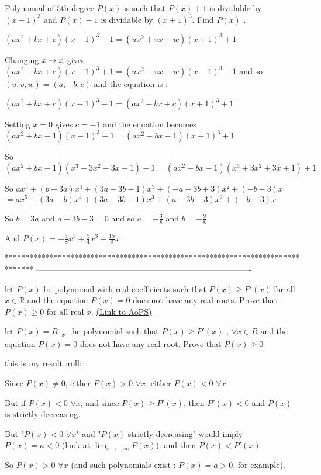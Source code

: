 \begin{solution}
	\begin{tcolorbox}Polynomial of $ 5$th degree $ P(x)$ is such that $ P(x) + 1$ is dividable by $ (x - 1)^3$ and $ P(x) - 1$ is dividable by $ (x + 1)^3$.
Find $ P(x)$ .\end{tcolorbox}

$ (ax^2+bx+c)(x-1)^3-1=(ux^2+vx+w)(x+1)^3+1$

Changing $ x\to\-x$ gives $ (ax^2-bx+c)(x+1)^3+1=(ux^2-vx+w)(x-1)^3-1$ and so $ (u,v,w)=(a,-b,c)$ and the equation is :

$ (ax^2+bx+c)(x-1)^3-1=(ax^2-bx+c)(x+1)^3+1$

Setting $ x=0$ gives $ c=-1$ and the equation becomes $ (ax^2+bx-1)(x-1)^3-1=(ax^2-bx-1)(x+1)^3+1$

So $ (ax^2+bx-1)(x^3-3x^2+3x-1)-1=(ax^2-bx-1)(x^3+3x^2+3x+1)+1$

So $ ax^5+(b-3a)x^4+(3a-3b-1)x^3+(-a+3b+3)x^2+(-b-3)x$ $ =ax^5+(3a-b)x^4+(3a-3b-1)x^3+(a-3b-3)x^2+(-b-3)x$

So $ b=3a$ and $ a-3b-3=0$ and so $ a=-\frac 38$ and $ b=-\frac 98$

And $ P(x)=-\frac 38x^5+\frac 54x^3-\frac {15}8x$
\end{solution}
*******************************************************************************
-------------------------------------------------------------------------------

\begin{problem}
	let $ P(x)$ be polynomial with real coefficients such that $ P(x) \ge P'(x)$ for all$ x \in \mathbb R$ and the equation $ P(x)=0$ does not have any real roots. Prove that $ P(x) \ge 0$ for all real $x$.
	\flushright \href{https://artofproblemsolving.com/community/c6h303472}{(Link to AoPS)}
\end{problem}



\begin{solution}
	\begin{tcolorbox}let $ P(x) = R_{[x]}$ be polynomial such that $ P(x) \ge P'(x)$ , $ \forall x \in R$ and the equation $ P(x) = 0$ does not have any real root.
Prove that $ P(x) \ge 0$

this is my result  :roll:\end{tcolorbox}

Since $ P(x)\neq 0$, either $ P(x)>0$ $ \forall x$, either $ P(x)<0$ $ \forall x$

But if $ P(x)<0$ $ \forall x$, and since $ P(x) \geq P'(x)$, then $ P'(x)<0$ and $ P(x)$ is strictly decreasing.

But "$ P(x)<0$ $ \forall x$" and "$ P(x)$ strictly decreasing" would imply $ P(x)=a <0$ (look at $ \lim_{x\to -\infty}P(x)$). and then $ P(x)<P'(x)$

So $ P(x)>0$ $ \forall x$ (and such polynomials exist : $ P(x)=a>0$, for example).
\end{solution}



